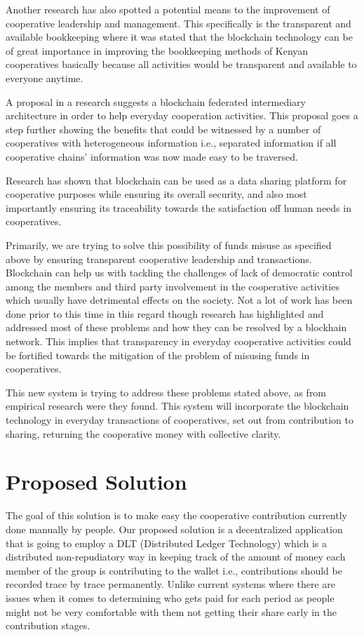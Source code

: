 \documentclass{article}
\begin{document}
Another research has also spotted a potential means to the improvement of cooperative leadership and management. This specifically is the transparent and available bookkeeping where it was stated that the blockchain technology can be of great importance in improving the bookkeeping methods of Kenyan cooperatives basically because all activities would be transparent and available to everyone anytime. \cite{mitch_national}

A proposal in a research suggests a blockchain federated intermediary architecture in order to help everyday cooperation activities. This proposal goes a step further showing the benefits that could be witnessed by a number of cooperatives with heterogeneous information i.e., separated information if all cooperative chains' information was now made easy to be traversed. \cite{ieee_s8637578} 

Research has shown that blockchain can be used as a data sharing platform for cooperative purposes while ensuring its overall security, and also most importantly ensuring its traceability towards the satisfaction off human needs in cooperatives. \cite{alma991019580288704436, proquest2282979983} 

Primarily, we are trying to solve this possibility of funds misuse as specified above by ensuring transparent cooperative leadership and transactions. Blockchain can help us with tackling the challenges of lack of democratic control among the members and third party involvement in the cooperative activities which usually have detrimental effects on the society.
Not a lot of work has been done prior to this time in this regard though research has highlighted and addressed most of these problems and how they can be resolved by a blockhain network. This implies that transparency in everyday cooperative activities could be fortified towards the mitigation of the problem of misusing funds in cooperatives.

This new system is trying to address these problems stated above, as from empirical research were they found. This system will incorporate the blockchain technology in everyday transactions of cooperatives, set out from contribution to sharing, returning the cooperative money with collective clarity.

\section{Proposed Solution}
The goal of this solution is to make easy the cooperative contribution currently done manually by people. Our proposed solution is a decentralized application that is going to employ a DLT (Distributed Ledger Technology) which is a distributed non-repudiatory way in keeping track of the amount of money each member of the group is contributing to the wallet i.e., contributions should be recorded trace by trace permanently. Unlike current systems where there are issues when it comes to determining who gets paid for each period as people might not be very comfortable with them not getting their share early in the contribution stages. 
\end{document}
